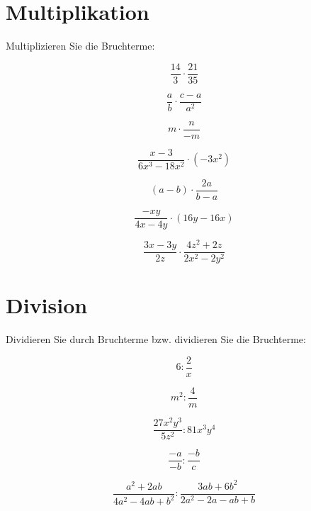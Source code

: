 \newpage
\section{Multiplikation}
Multiplizieren Sie die Bruchterme:

\begin{bbwAufgabenBlock}

\item $$\frac{14}3 \cdot{} \frac{21}{35}$$

\item $$\frac{a}b \cdot{} \frac{c-a}{a^2}$$

\item $$m \cdot{} \frac{n}{-m}$$

\item $$\frac{x-3}{6x^3-18x^2} \cdot{} \left(-3x^2\right)$$

\item $$(a-b) \cdot{} \frac{2a}{b-a}$$

\item $$\frac{-xy}{4x-4y} \cdot{} \left(16y-16x\right)$$

\item $$\frac{3x-3y}{2z} \cdot{} \frac{4z^2 + 2z}{2x^2-2y^2}$$
\end{bbwAufgabenBlock}
\newpage
\section{Division}
Dividieren Sie durch Bruchterme bzw. dividieren Sie die Bruchterme:

\begin{bbwAufgabenBlock}
\item $$6 : \frac2{x}$$

\item $$m^2 : \frac4{m}$$

\item $$\frac{27x^2y^3}{5z^2} : 81x^3y^4$$

\item $$\frac{-a}{-b} : \frac{-b}{c}$$

\item $$\frac{a^2+2ab}{4a^2-4ab+b^2} : \frac{3ab+6b^2}{2a^2-2a-ab+b}$$

\end{bbwAufgabenBlock}
\newpage
